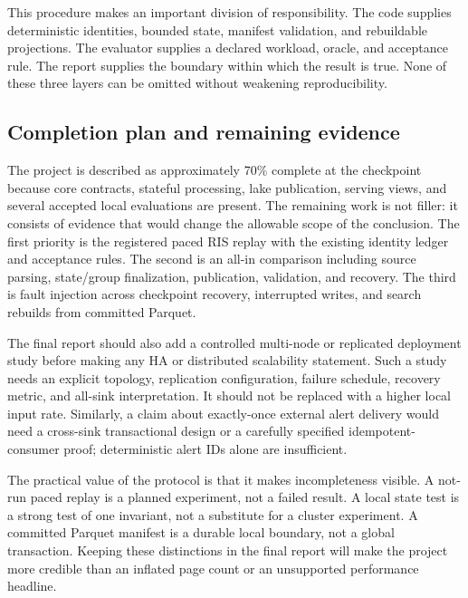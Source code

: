 This procedure makes an important division of responsibility. The code supplies deterministic identities, bounded state, manifest validation, and rebuildable projections. The evaluator supplies a declared workload, oracle, and acceptance rule. The report supplies the boundary within which the result is true. None of these three layers can be omitted without weakening reproducibility.

\subsection{Completion plan and remaining evidence}

The project is described as approximately 70\% complete at the checkpoint because core contracts, stateful processing, lake publication, serving views, and several accepted local evaluations are present. The remaining work is not filler: it consists of evidence that would change the allowable scope of the conclusion. The first priority is the registered paced RIS replay with the existing identity ledger and acceptance rules. The second is an all-in comparison including source parsing, state/group finalization, publication, validation, and recovery. The third is fault injection across checkpoint recovery, interrupted writes, and search rebuilds from committed Parquet.

The final report should also add a controlled multi-node or replicated deployment study before making any HA or distributed scalability statement. Such a study needs an explicit topology, replication configuration, failure schedule, recovery metric, and all-sink interpretation. It should not be replaced with a higher local input rate. Similarly, a claim about exactly-once external alert delivery would need a cross-sink transactional design or a carefully specified idempotent-consumer proof; deterministic alert IDs alone are insufficient.

The practical value of the protocol is that it makes incompleteness visible. A not-run paced replay is a planned experiment, not a failed result. A local state test is a strong test of one invariant, not a substitute for a cluster experiment. A committed Parquet manifest is a durable local boundary, not a global transaction. Keeping these distinctions in the final report will make the project more credible than an inflated page count or an unsupported performance headline.
